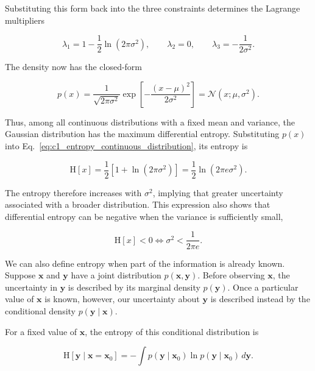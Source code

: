 \documentclass[10pt,twocolumn]{memoir}
\begin{document}
Substituting this form back into the three constraints determines the Lagrange multipliers

\begin{equation}
    \lambda_1 = 1-\frac{1}{2}\ln(2\pi\sigma^2),
    \qquad
    \lambda_2=0,
    \qquad
    \lambda_3=-\frac{1}{2\sigma^2}.
\end{equation}

The density now has the closed-form

\begin{equation}
    p(x) = \frac{1}{\sqrt{2\pi\sigma^2}}\exp\left[-\frac{(x-\mu)^2}{2\sigma^2}\right] = \mathcal{N}(x;\mu,\sigma^2).
\end{equation}

Thus, among all continuous distributions with a fixed mean and variance, the Gaussian distribution has the maximum differential entropy. Substituting $p(x)$ into Eq.~\ref{eq:c1_entropy_continuous_distribution}, its entropy is

\begin{equation}
    \mathrm{H}[x] = \frac{1}{2}\left[1+\ln(2\pi\sigma^2)\right] = \frac{1}{2}\ln(2\pi e\sigma^2).
\end{equation}

The entropy therefore increases with $\sigma^2$, implying that greater uncertainty associated with a broader distribution. This expression also shows that differential entropy can be negative when the variance is sufficiently small,

\begin{equation}
    \mathrm{H}[x] < 0 \iff \sigma^2 < \frac{1}{2\pi e}.
\end{equation}

We can also define entropy when part of the information is already known. Suppose $\mathbf{x}$ and $\mathbf{y}$ have a joint distribution $p(\mathbf{x},\mathbf{y})$. Before observing $\mathbf{x}$, the uncertainty in $\mathbf{y}$ is described by its marginal density $p(\mathbf{y})$. Once a particular value of $\mathbf{x}$ is known, however, our uncertainty about $\mathbf{y}$ is described instead by the conditional density $p(\mathbf{y}\mid\mathbf{x})$.

For a fixed value of $\mathbf{x}$, the entropy of this conditional distribution is

\begin{equation}
    \mathrm{H}[\mathbf{y}\mid\mathbf{x}=\mathbf{x}_0] = -\int p(\mathbf{y}\mid\mathbf{x}_0) \ln p(\mathbf{y}\mid\mathbf{x}_0)\,d\mathbf{y}.
\end{equation}
\end{document}
